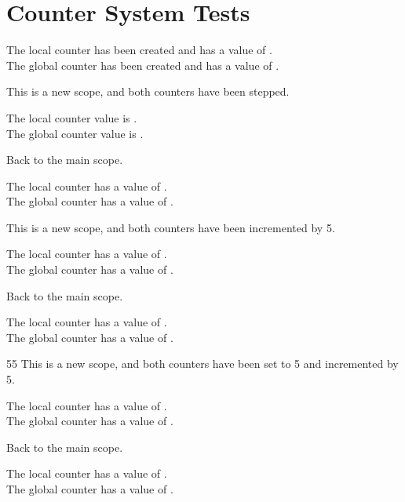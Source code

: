 \section{Counter System Tests}
{
    The local  counter has been created and has a value of .\\
    The global counter has been created and has a value of .

    {
    This is a new scope, and both counters  have been stepped.

    The local  counter value is .\\
    The global counter value is .
    }

    Back to the main scope.

    The local  counter has a value of .\\
    The global counter has a value of .
    
    {
    This is a new scope, and both counters have been incremented by 5.

    The local  counter has a value of .\\
    The global counter has a value of .
    }

    Back to the main scope.

    The local  counter has a value of .\\
    The global counter has a value of .

    {
     {5}{5}
    This is a new scope, and both counters have been set to 5 and incremented by 5.

    The local  counter has a value of .\\
    The global counter has a value of .
    }

    Back to the main scope.

    The local  counter has a value of .\\
    The global counter has a value of .
}


